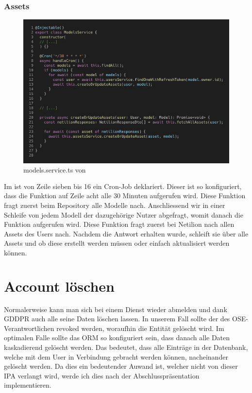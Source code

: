 \subsubsection{Assets}
\begin{figure}[H]
  \centering
  \includegraphics[width=.95\linewidth]{./images/models.service.ts.png}
  \caption[{models.service.ts von }]{models.service.ts von }
  \label{fig:models-service}
\end{figure}
Im  ist von Zeile sieben bis 16 ein Cron-Job deklariert. Dieser ist so konfiguriert, dass die  Funktion auf Zeile acht alle 30 Minuten aufgerufen wird. Diese Funktion fragt zuerst beim Repository alle Modelle nach. Anschliessend wir in einer Schleife von jedem Modell der dazugehörige Nutzer abgefragt, womit danach die Funktion  aufgerufen wird.
\newline
Diese Funktion fragt zuerst bei Netilion nach allen Assets des Users nach. Nachdem die Antwort erhalten wurde, schleift sie über alle Assets und ob diese erstellt werden müssen oder einfach aktualisiert werden können.
\section{Account löschen}
Normalerweise kann man sich bei einem Dienst wieder abmelden und dank GDDPR auch alle seine Daten löschen lassen. In unserem Fall sollte der  des OSE-Verantwortlichen revoked werden, woraufhin die Entität gelöscht wird. Im optimalen Falle sollte das ORM so konfiguriert sein, dass danach alle Daten kaskadierend gelöscht werden. Das bedeutet, dass alle Einträge in der Datenbank, welche mit dem User in Verbindung gebracht werden können, nacheinander gelöscht werden.
\newline
Da dies ein bedeutender Auwand ist, welcher nicht von dieser IPA verlangt wird, werde ich dies nach der Abschlusspräsentation implementieren.
